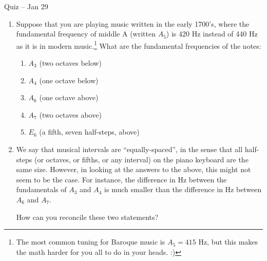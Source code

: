 \documentclass[10pt]{article}
\newcommand{\vshi}{\vspace{0.5in}}
\begin{document}
\begin{center} \sc \Large Quiz -- Jan 29\end{center}

  \begin{enumerate}
    \item Suppose that you are playing music written in the early 1700's, where the fundamental frequency of middle A (written $A_5$) is 420 Hz instead of 440 Hz as it is in modern
      music.\footnote{The most common tuning for Baroque music is $A_5 = 415$ Hz, but this makes the math harder for you all to do in your heads. :)}  What are the fundamental frequencies of the notes:

      \begin{enumerate}
	\item $A_3$ (two octaves below)
	  \vshi
	\item $A_4$ (one octave below)
	  \vshi

	\item $A_6$ (one octave above)
	  \vshi

	\item $A_7$ (two octaves above)
	  \vshi

	\item $E_6$ (a fifth, seven half-steps, above)
	  \vshi

      \end{enumerate}

    \item We say that musical intervals are ``equally-spaced'', in the sense that all half-steps (or octaves, or fifths, or any interval) on the piano keyboard
      are the same size. However, in looking at the answers to the above, this might not seem to be the case. For instance, the difference in Hz between the fundamentals of 
      $A_3$ and $A_4$ is much smaller than the difference in Hz between $A_6$ and $A_7$. 

      How can you reconcile these two statements?

  \end{enumerate}
\end{document}
